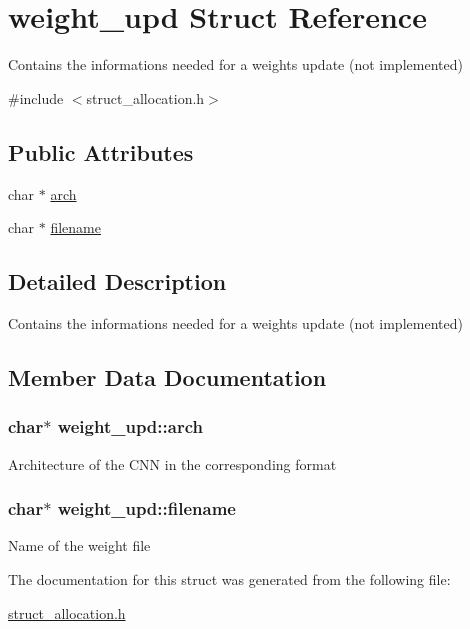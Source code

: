 \hypertarget{structweight__upd}{}\section{weight\+\_\+upd Struct Reference}
\label{structweight__upd}


Contains the informations needed for a weights update (not implemented)  




{\ttfamily \#include $<$struct\+\_\+allocation.\+h$>$}

\subsection*{Public Attributes}
\begin{DoxyCompactItemize}
\item 
char $\ast$ \hyperlink{structweight__upd_ac8f1fc5020ca354aeef8456e05d08394}{arch}
\item 
char $\ast$ \hyperlink{structweight__upd_a305525bc66de05c1d30687bb0741f074}{filename}
\end{DoxyCompactItemize}


\subsection{Detailed Description}
Contains the informations needed for a weights update (not implemented) 

\subsection{Member Data Documentation}
\subsubsection[{\texorpdfstring{arch}{arch}}]{\setlength{\rightskip}{0pt plus 5cm}char$\ast$ weight\+\_\+upd\+::arch}\hypertarget{structweight__upd_ac8f1fc5020ca354aeef8456e05d08394}{}\label{structweight__upd_ac8f1fc5020ca354aeef8456e05d08394}
Architecture of the C\+NN in the corresponding format 
\subsubsection[{\texorpdfstring{filename}{filename}}]{\setlength{\rightskip}{0pt plus 5cm}char$\ast$ weight\+\_\+upd\+::filename}\hypertarget{structweight__upd_a305525bc66de05c1d30687bb0741f074}{}\label{structweight__upd_a305525bc66de05c1d30687bb0741f074}
Name of the weight file 

The documentation for this struct was generated from the following file\+:\begin{DoxyCompactItemize}
\item 
\hyperlink{struct__allocation_8h}{struct\+\_\+allocation.\+h}\end{DoxyCompactItemize}
